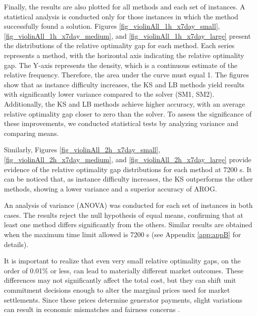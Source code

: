 Finally, the results are also plotted for all methods and each set of instances. A statistical analysis is conducted only for those instances in which the method successfully found a solution. Figures \ref{fig_violinAll_1h_x7day_small}, \ref{fig_violinAll_1h_x7day_medium}, and \ref{fig_violinAll_1h_x7day_large} present the distributions of the relative optimality gap for each method. Each series represents a method, with the horizontal axis indicating the relative optimality gap. The Y-axis represents the density, which is a continuous estimate of the relative frequency. Therefore, the area under the curve must equal 1. The figures show that as instance difficulty increases, the KS and LB methods yield results with significantly lower variance compared to the solver (SM1, SM2). Additionally, the KS and LB methods achieve higher accuracy, with an average relative optimality gap closer to zero than the solver. To assess the significance of these improvements, we conducted statistical tests by analyzing variance and comparing means. 

Similarly, Figures \ref{fig_violinAll_2h_x7day_small}, \ref{fig_violinAll_2h_x7day_medium}, and \ref{fig_violinAll_2h_x7day_large} provide evidence of the relative optimality gap distributions for each method at 7200 s. It can be noticed that, as instance difficulty increases, the KS outperforms the other methods, showing a lower variance and a superior accuracy of AROG.

An analysis of variance (ANOVA) was conducted for each set of instances in both cases. The results reject the null hypothesis of equal means, confirming that at least one method differs significantly from the others. Similar results are obtained when the maximum time limit allowed is 7200 s (see Appendix \ref{app:appB} for details).



It is important to realize that even very small relative optimality gaps, on the order of 0.01\% or less, can lead to materially different market outcomes. These differences may not significantly affect the total cost, but they can shift unit commitment decisions enough to alter the marginal prices used for market settlements. Since these prices determine generator payments, slight variations can result in economic mismatches and fairness concerns \citep{Johnson1997}.

